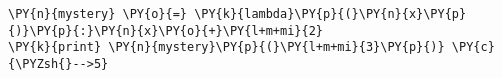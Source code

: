 \begin{Verbatim}[commandchars=\\\{\}]
\PY{n}{mystery} \PY{o}{=} \PY{k}{lambda}\PY{p}{(}\PY{n}{x}\PY{p}{)}\PY{p}{:}\PY{n}{x}\PY{o}{+}\PY{l+m+mi}{2}
\PY{k}{print} \PY{n}{mystery}\PY{p}{(}\PY{l+m+mi}{3}\PY{p}{)} \PY{c}{\PYZsh{}-->5}
\end{Verbatim}
